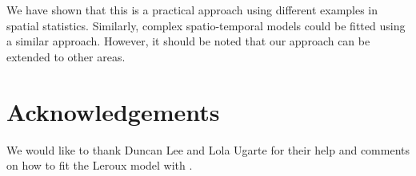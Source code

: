\documentclass[article]{jss}
\begin{document}
We have shown that this is a practical approach using different examples in
spatial statistics. Similarly, complex spatio-temporal models could be fitted
using a similar approach. However, it should be noted that our approach can be
extended to other areas.

\section{Acknowledgements}

We would like to thank Duncan Lee and Lola Ugarte for their help and comments
on how to fit the Leroux model with .


%

\end{document}
